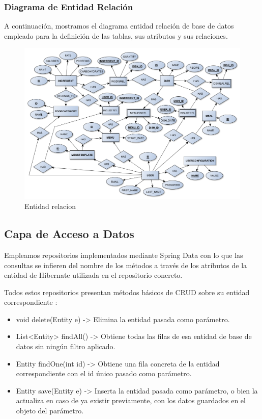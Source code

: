 \documentclass[12pt, a4paper, twoside]{book}
\begin{document}
	\subsubsection{Diagrama de Entidad Relación}
	A continuación, mostramos el diagrama entidad relación de base de datos empleado para la definición de las tablas, sus atributos y sus relaciones.
	\begin{figure}[H]
		\centering
		\includegraphics[width=15cm]{Imagenes/EntidadRelacion.png}
		\caption{Entidad relacion}\label{Entidad relacion}
	\end{figure}
	
	\subsection{Capa de Acceso a Datos}
	
	Empleamos repositorios implementados mediante Spring Data con lo que las consultas se infieren del nombre de los métodos a través de los atributos de la entidad de Hibernate utilizada en el repositorio concreto.
	
	Todos estos repositorios presentan métodos básicos de CRUD sobre su entidad correspondiente : 
	\begin{itemize}
		\item void delete(Entity e) -> Elimina la entidad pasada como parámetro.
		\item List<Entity> findAll() -> Obtiene todas las filas de esa entidad de base de datos sin ningún filtro aplicado.
		\item Entity findOne(int id) -> Obtiene una fila concreta de la entidad correspondiente con el id único pasado como parámetro.
		\item Entity save(Entity e) -> Inserta la entidad pasada como parámetro, o bien la actualiza en caso de ya existir previamente, con los datos guardados en el objeto del parámetro.
	\end{itemize}
	
\end{document}

